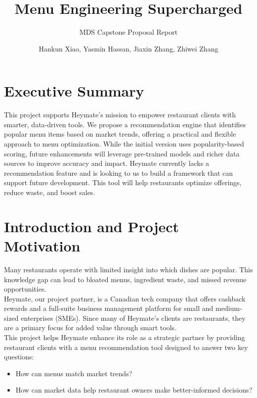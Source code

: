 \documentclass[
  11pt,
  a4paper,
  DIV=11,
  numbers=noendperiod]{scrartcl}
\title{Menu Engineering Supercharged}
\subtitle{MDS Capstone Proposal Report}
\author{Hankun Xiao, Yasmin Hassan, Jiaxin Zhang, Zhiwei Zhang}
\date{}
\providecommand{\tightlist}{%
  \setlength{\itemsep}{0pt}\setlength{\parskip}{0pt}}\usepackage{longtable,booktabs,array}
\renewcommand*\contentsname{Table of contents}
\newcommand\contentsname{Table of contents}
\begin{document}
\maketitle

\renewcommand*\contentsname{Table of contents}
{
\hypersetup{linkcolor=}
\setcounter{tocdepth}{2}
\tableofcontents
}

\section{Executive Summary}\label{executive-summary}

This project supports Heymate's mission to empower restaurant clients
with smarter, data-driven tools. We propose a recommendation engine that
identifies popular menu items based on market trends, offering a
practical and flexible approach to menu optimization. While the initial
version uses popularity-based scoring, future enhancements will leverage
pre-trained models and richer data sources to improve accuracy and
impact. Heymate currently lacks a recommendation feature and is looking
to us to build a framework that can support future development. This
tool will help restaurants optimize offerings, reduce waste, and boost
sales.

\section{Introduction and Project
Motivation}\label{introduction-and-project-motivation}

Many restaurants operate with limited insight into which dishes are
popular. This knowledge gap can lead to bloated menus, ingredient waste,
and missed revenue opportunities.\\
Heymate, our project partner, is a Canadian tech company that offers
cashback rewards and a full-suite business management platform for small
and medium-sized enterprises (SMEs). Since many of Heymate's clients are
restaurants, they are a primary focus for added value through smart
tools.\\
This project helps Heymate enhance its role as a strategic partner by
providing restaurant clients with a menu recommendation tool designed to
answer two key questions:

\begin{itemize}
\tightlist
\item
  How can menus match market trends?\\
\item
  How can market data help restaurant owners make better-informed
  decisions?
\end{itemize}
\end{document}
